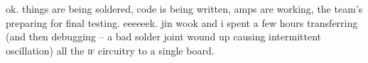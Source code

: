 ok. things are being soldered, code is being written, amps are working, the
team's preparing for final testing. eeeeeek. jin wook and i spent a few hours
transferring (and then debugging -- a bad solder joint wound up causing
intermittent oscillation) all the \textsc{if} circuitry to a single board.
